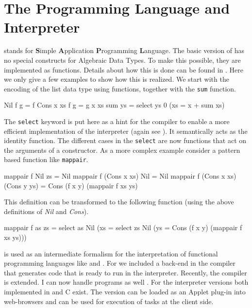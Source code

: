 \section{The \Sapl Programming Language and Interpreter}\label{sapljs:sec:sapl}
\Sapl stands for \textbf{S}imple \textbf{A}pplication \textbf{P}rogramming \textbf{L}anguage. The 
basic version of \Sapl has no special constructs for Algebraic Data Types. 
To make this possible, they are implemented as functions. 
Details about how this is done can be found in \cite{JKP}.
Here we only give a few examples to show how this is realized.
We start with the encoding of the list data type using functions, together with the \texttt{sum} function.
\begin{CleanCode}
Nil f g       =  f
Cons x xs f g = g x xs
sum ys        = select ys 0 (\x xs = x + sum xs)
\end{CleanCode}
The \texttt{select} keyword is put here as a hint for the compiler to enable a 
more efficient implementation of the \Sapl interpreter (again see \cite{JKP}). 
It semantically acts as the identity function.
The different cases in the \texttt{select} are now functions that act on the arguments of a constructor.
As a more complex example consider a pattern based \Haskell function like \texttt{mappair}.  
\begin{CleanCode}
mappair f Nil          zs           = Nil 
mappair f (Cons x xs)  Nil          = Nil 
mappair f (Cons x xs)  (Cons y ys)  = Cons (f x y) (mappair f xs ys) 
\end{CleanCode}
This definition can be transformed to the following \Sapl function (using the above definitions of \emph{Nil} and \emph{Cons}).
\begin{CleanCode}
mappair f as zs 
= select as Nil (\x xs = select zs Nil (\y ys = Cons (f x y) (mappair f xs ys)))
\end{CleanCode}
%
\Sapl is used as an intermediate formalism for the interpretation of functional programming languages 
like \Haskell and \Clean.  For \Clean we included a \Sapl back-end in the \Clean compiler that 
generates \Sapl code that is ready to run in the \Sapl interpreter. 
Recently, the \Clean compiler is extended. I can now handle \Haskell programs as well \cite{HASCLEAN}.
For the \Sapl interpreter versions both implemented in \Java and \textsf{C} exist. The \Java
version can be loaded as an \Java Applet plug-in into web-browsers 
and can be used for execution of \iTask tasks at the client side.

